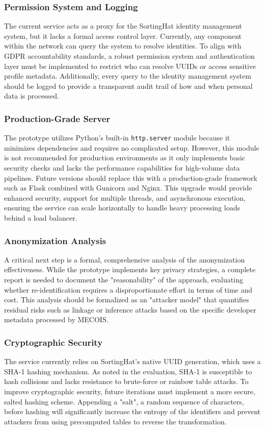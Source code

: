 \subsubsection{Permission System and Logging}
The current service acts as a proxy for the SortingHat identity management system, but it lacks a formal access control layer. Currently, any component within the network can query the system to resolve identities. To align with \ac{GDPR} accountability standards, a robust permission system and authentication layer must be implemented to restrict who can resolve \acp{UUID} or access sensitive profile metadata. Additionally, every query to the identity management system should be logged to provide a transparent audit trail of how and when personal data is processed.

\subsubsection{Production-Grade Server}
The prototype utilizes Python's built-in \texttt{http.server} module because it minimizes dependencies and requires no complicated setup. However, this module is not recommended for production environments as it only implements basic security checks and lacks the performance capabilities for high-volume data pipelines. Future versions should replace this with a production-grade framework such as Flask combined with Gunicorn and Nginx. This upgrade would provide enhanced security, support for multiple threads, and asynchronous execution, ensuring the service can scale horizontally to handle heavy processing loads behind a load balancer. 
\autocite{python_http_server_2026}
\autocite{anicsoft2026}

\subsubsection{Anonymization Analysis}
A critical next step is a formal, comprehensive analysis of the anonymization effectiveness. While the prototype implements key privacy strategies, a complete report is needed to document the "reasonability" of the approach, evaluating whether re-identification requires a disproportionate effort in terms of time and cost. This analysis should be formalized as an "attacker model" that quantifies residual risks such as linkage or inference attacks based on the specific developer metadata processed by MECOIS.

\subsubsection{Cryptographic Security}
The service currently relies on SortingHat's native \ac{UUID} generation, which uses a SHA-1 hashing mechanism. As noted in the evaluation, SHA-1 is susceptible to hash collisions and lacks resistance to brute-force or rainbow table attacks. To improve cryptographic security, future iterations must implement a more secure, salted hashing scheme. Appending a "salt", a random sequence of characters, before hashing will significantly increase the entropy of the identifiers and prevent attackers from using precomputed tables to reverse the transformation.
\autocite{python_hashlib_2026}

